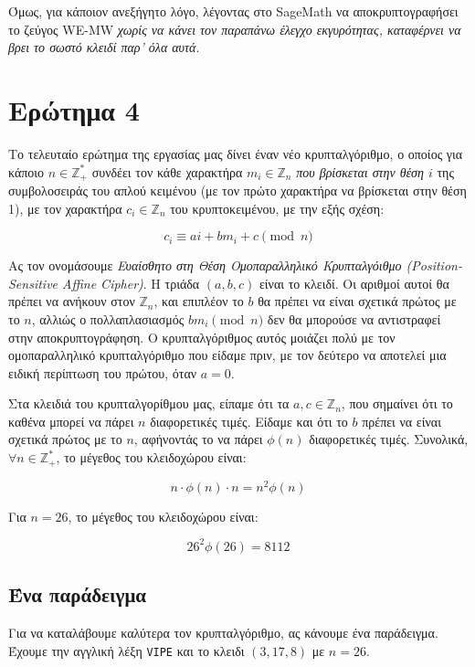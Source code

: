 \documentclass{article}
\begin{document}
Όμως, για κάποιον ανεξήγητο λόγο, λέγοντας στο SageMath να αποκρυπτογραφήσει το ζεύγος WE-MW \emph{χωρίς να κάνει τον παραπάνω έλεγχο εκγυρότητας, καταφέρνει να βρει το σωστό κλειδί παρ' όλα αυτά}.

\section*{Ερώτημα 4}

Το τελευταίο ερώτημα της εργασίας μας δίνει έναν νέο κρυπταλγόριθμο, ο οποίος για κάποιο $n \in \mathbb{Z}_+^*$ συνδέει τον κάθε χαρακτήρα $m_i \in \mathbb{Z}_n$ \emph{που βρίσκεται στην θέση $i$} της συμβολοσειράς του απλού κειμένου (με τον πρώτο χαρακτήρα να βρίσκεται στην θέση 1), με τον χαρακτήρα $c_i \in \mathbb{Z}_n$ του κρυπτοκειμένου, με την εξής σχέση:

$$c_i \equiv ai + bm_i + c \pmod n$$

Ας τον ονομάσουμε \emph{Ευαίσθητο στη Θέση Ομοπαραλληλικό Κρυπταλγόιθμο (Position-Sensitive Affine Cipher)}. Η τριάδα $(a, b, c)$ είναι το κλειδί. Οι αριθμοί αυτοί θα πρέπει να ανήκουν στον $\mathbb{Z}_n$, και επιπλέον το $b$ θα πρέπει να είναι σχετικά πρώτος με το $n$, αλλιώς ο πολλαπλασιασμός $bm_i \pmod n$ δεν θα μπορούσε να αντιστραφεί στην αποκρυπτογράφηση. Ο κρυπταλγόριθμος αυτός μοιάζει πολύ με τον ομοπαραλληλικό κρυπταλγόριθμο που είδαμε πριν, με τον δεύτερο να αποτελεί μια ειδική περίπτωση του πρώτου, όταν $a = 0$.

Στα κλειδιά του κρυπταλγορίθμου μας, είπαμε ότι τα $a, c \in \mathbb{Z}_n$, που σημαίνει ότι το καθένα μπορεί να πάρει $n$ διαφορετικές τιμές. Είδαμε και ότι το $b$ πρέπει να είναι σχετικά πρώτος με το $n$, αφήνοντάς το να πάρει $\phi(n)$ διαφορετικές τιμές. Συνολικά, $\forall n \in \mathbb{Z}_+^*$, το μέγεθος του κλειδοχώρου είναι:

$$n \cdot \phi(n) \cdot n = n^2\phi(n)$$

Για $n = 26$, το μέγεθος του κλειδοχώρου είναι:

$$26^2\phi(26) = 8112$$

\subsection*{Ένα παράδειγμα}

Για να καταλάβουμε καλύτερα τον κρυπταλγόριθμο, ας κάνουμε ένα παράδειγμα. Έχουμε την αγγλική λέξη \texttt{VIPE} και το κλειδι $(3, 17, 8)$ με $n = 26$.
\end{document}
